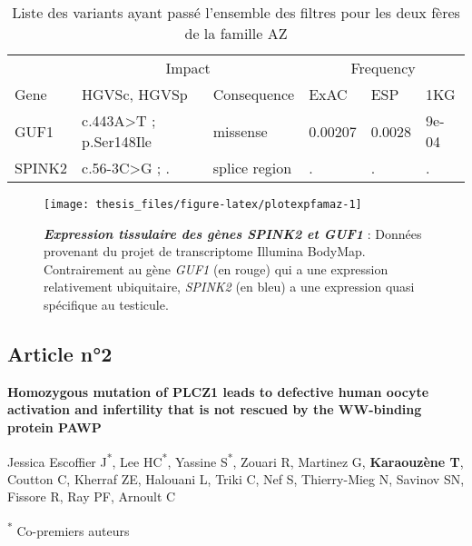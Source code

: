 \documentclass[12pt,a4paper,twoside]{ugathesis}
\begin{document}
\begin{longtable}[t]{llllll}
\caption{\label{tab:tabrecapaz}Liste des variants ayant passé l'ensemble des filtres pour les deux fères de la famille AZ}\\
\toprule
\multicolumn{1}{c}{ } & \multicolumn{2}{c}{Impact} & \multicolumn{3}{c}{Frequency} \\
\cmidrule(l{2pt}r{2pt}){2-3} \cmidrule(l{2pt}r{2pt}){4-6}
Gene & HGVSc, HGVSp & Consequence & ExAC & ESP & 1KG\\
\midrule
GUF1 & c.443A>T ; p.Ser148Ile & missense & 0.00207 & 0.0028 & 9e-04\\
SPINK2 & c.56-3C>G ; . & splice region & . & . & .\\
\bottomrule
\end{longtable}

\begin{figure}

{\centering \texttt{[image: thesis\_files/figure-latex/plotexpfamaz-1]} 

}

\caption[Expression tissulaire des gènes \emph{SPINK2} et
\emph{GUF1}]{\textbf{\emph{Expression tissulaire des gènes
\emph{SPINK2} et \emph{GUF1}}} : Données provenant du projet de
transcriptome Illumina BodyMap. Contrairement au gène \emph{GUF1} (en
rouge) qui a une expression relativement ubiquitaire, \emph{SPINK2} (en
bleu) a une expression quasi spécifique au testicule.}\label{fig:plotexpfamaz}
\end{figure}










\newpage

\subsection{Article n°2}\label{article-n2}

\textbf{Homozygous mutation of PLCZ1 leads to defective human oocyte
activation and infertility that is not rescued by the WW-binding protein
PAWP}

Jessica Escoffier J\textsuperscript{*}, Lee HC\textsuperscript{*},
Yassine S\textsuperscript{*}, Zouari R, Martinez G, \textbf{Karaouzène
T}, Coutton C, Kherraf ZE, Halouani L, Triki C, Nef S, Thierry-Mieg N,
Savinov SN, Fissore R, Ray PF, Arnoult C

\textsuperscript{*} Co-premiers auteurs
\end{document}
